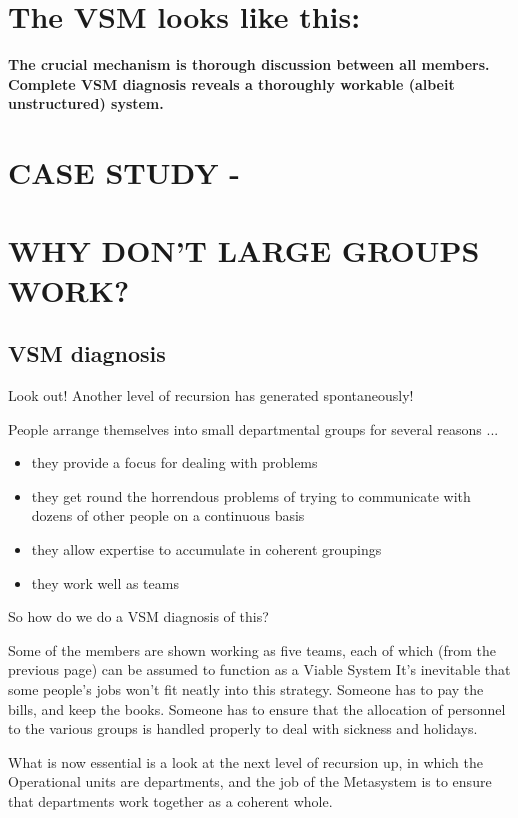 \section*{The VSM looks like this:}
\textbf{The crucial mechanism is thorough discussion between all members.} \textbf{Complete VSM diagnosis reveals a thoroughly workable (albeit unstructured) system.}

\section*{CASE STUDY -}

\section*{WHY DON'T LARGE GROUPS WORK?}

\subsection*{VSM diagnosis}
Look out! Another level of recursion has generated spontaneously!

People arrange themselves into small departmental groups for several reasons ...

\begin{itemize}
  \item they provide a focus for dealing with problems

  \item they get round the horrendous problems of trying to communicate with dozens of other people on a continuous basis

  \item they allow expertise to accumulate in coherent groupings

  \item they work well as teams

\end{itemize}

So how do we do a VSM diagnosis of this?

Some of the members are shown working as five teams, each of which (from the previous page) can be assumed to function as a Viable System It's inevitable that some people's jobs won't fit neatly into this strategy. Someone has to pay the bills, and keep the books. Someone has to ensure that the allocation of personnel to the various groups is handled properly to deal with sickness and holidays.

What is now essential is a look at the next level of recursion up, in which the Operational units are departments, and the job of the Metasystem is to ensure that departments work together as a coherent whole.


